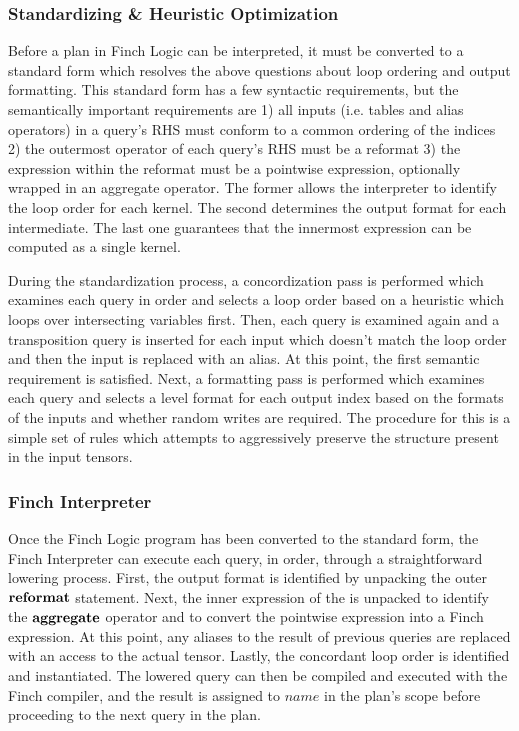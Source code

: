 \subsubsection{Standardizing \& Heuristic Optimization}
Before a plan in Finch Logic can be interpreted, it must be converted to a standard form which resolves the above questions about loop ordering and output formatting. This standard form has a few syntactic requirements, but the semantically important requirements are 1) all inputs (i.e. tables and alias operators) in a query's RHS must conform to a common ordering of the indices 2) the outermost operator of each query's RHS must be a reformat 3) the expression within the reformat must be a pointwise expression, optionally wrapped in an aggregate operator. The former allows the interpreter to identify the loop order for each kernel. The second determines the output format for each intermediate. The last one guarantees that the innermost expression can be computed as a single kernel.

During the standardization process, a concordization pass is performed which examines each query in order and selects a loop order based on a heuristic which loops over intersecting variables first. Then, each query is examined again and a transposition query is inserted for each input which doesn't match the loop order and then the input is replaced with an alias. At this point, the first semantic requirement is satisfied. Next, a formatting pass is performed which examines each query and selects a level format for each output index based on the formats of the inputs and whether random writes are required. The procedure for this is a simple set of rules which attempts to aggressively preserve the structure present in the input tensors.


\subsubsection{Finch Interpreter} 
Once the Finch Logic program has been converted to the standard form, the Finch Interpreter can execute each query, in order, through a straightforward lowering process. First, the output format is identified by unpacking the outer $\text{\textbf{reformat}}$ statement. Next, the inner expression of the is unpacked to identify the $\text{\textbf{aggregate}}$ operator and to convert the pointwise expression into a Finch expression. At this point, any aliases to the result of previous queries are replaced with an access to the actual tensor. Lastly, the concordant loop order is identified and instantiated. The lowered query can then be compiled and executed with the Finch compiler, and the result is assigned to $name$ in the plan's scope before proceeding to the next query in the plan. 


